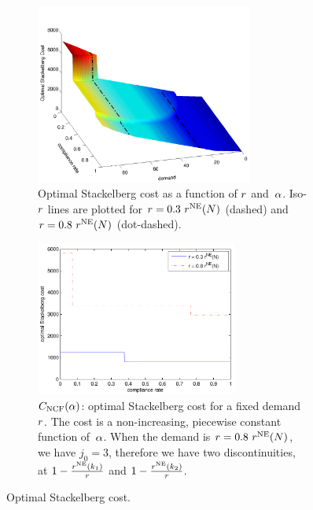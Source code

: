 \begin{figure}[h]
\centering
\begin{subfigure}[b]{3.3in}
\centering
\includegraphics[width=2.8in]{figures/cost_surface}
\caption{Optimal Stackelberg cost as a function of $r$ and~$\alpha$. Iso-$r$ lines are plotted for $r = 0.3 \ r^{\textup{NE}} ( N )$ (dashed) and ${ \demand = 0.8 \ \demandMax{\NLinks} }$ (dot-dashed).}
\label{fig:num_cost_1}
\end{subfigure}

\begin{subfigure}[b]{3.3in}
\vspace{10pt}
\centering
\includegraphics[width=2.6in]{figures/cost}
\caption{$C_{\textup{NCF}}(\alpha)$: optimal Stackelberg cost for a fixed demand $r$. The cost is a non-increasing, piecewise constant function of~$\alpha$. When the demand is ${ \demand = 0.8 \ \demandMax{\NLinks} }$, we have $j_0 = 3$, therefore we have two discontinuities, at $1 - \frac{r^{\textup{NE}} ( k_1 )}{r}$ and $1 - \frac{r^{\textup{NE}} ( k_2 )}{r}$.}
\label{fig:num_cost_2}
\end{subfigure}

\caption{Optimal Stackelberg cost.}
\label{fig:num_cost}
\end{figure}


